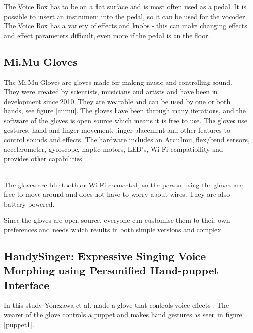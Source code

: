 The Voice Box has to be on a flat surface and is most often used as a pedal. It is possible to insert an instrument into the pedal, so it can be used for the vocoder. The Voice Box has a variety of effects and knobs - this can make changing effects and effect parameters difficult, even more if the pedal is on the floor.

\subsection{Mi.Mu Gloves}

The Mi.Mu Gloves are gloves made for making music and controlling sound\citep{Mimu}. They were created by scientists, musicians and artists and have been in development since 2010. They are wearable and can be used by one or both hands, see figure \ref{mimu}. The gloves have been through many iterations, and the software of the gloves is open source which means it is free to use. The gloves use gestures, hand and finger movement, finger placement and other features to control sounds and effects. The hardware includes an ArduImu, flex/bend sensors, accelerometer, gyroscope, haptic motors, LED's, Wi-Fi compatibility and provides other capabilities.\\

\begin{minipage}{\linewidth}%
\label{mimu}
\end{minipage}\\

The gloves are bluetooth or Wi-Fi connected, so the person using the gloves are free to move around and does not have to worry about wires. They are also battery powered. 

Since the gloves are open source, everyone can customise them to their own preferences and needs which results in both simple versions and complex.

\subsection{HandySinger: Expressive Singing Voice Morphing using Personified Hand-puppet Interface}

In this study Yonezawa et al. made a glove that controls voice effects \citep{Yonezawa_2005}. The wearer of the glove controls a puppet and makes hand gestures as seen in figure \ref{puppet1}. \\

